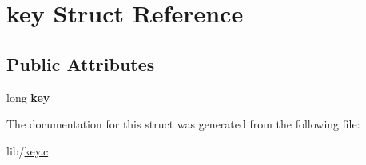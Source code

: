\hypertarget{structkey}{}\section{key Struct Reference}
\label{structkey}
\subsection*{Public Attributes}
\begin{DoxyCompactItemize}
\item 
long {\bfseries key}\hypertarget{structkey_a2498705c24e7e286c7ce54961a1417e3}{}\label{structkey_a2498705c24e7e286c7ce54961a1417e3}

\end{DoxyCompactItemize}


The documentation for this struct was generated from the following file\+:\begin{DoxyCompactItemize}
\item 
lib/\hyperlink{key_8c}{key.\+c}\end{DoxyCompactItemize}
